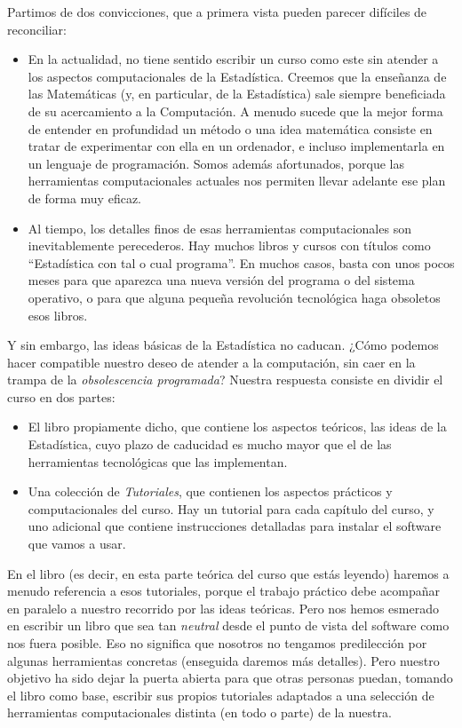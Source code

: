 \noindent Partimos de dos convicciones, que a primera vista pueden parecer difíciles de reconciliar:
\begin{itemize}
  \item En la actualidad, no tiene sentido escribir un curso como este sin atender a los aspectos computacionales de la Estadística. Creemos que la enseñanza de las Matemáticas (y, en particular, de la Estadística) sale siempre beneficiada de su acercamiento a la Computación. A menudo sucede que la mejor forma de entender en profundidad un método o una idea matemática consiste en tratar de experimentar con ella en un ordenador, e incluso implementarla en un lenguaje de programación. Somos además afortunados, porque las herramientas computacionales actuales nos permiten llevar adelante ese plan de forma muy eficaz.
  \item Al tiempo, los detalles finos de esas herramientas computacionales son inevitablemente perecederos. Hay muchos libros y cursos con títulos como ``Estadística con tal o cual programa''. En muchos casos, basta con unos pocos meses para que aparezca una nueva versión del programa o del sistema operativo, o para que alguna pequeña revolución tecnológica haga obsoletos esos libros.
\end{itemize}
Y sin embargo, las ideas básicas de la Estadística no caducan. ¿Cómo podemos hacer compatible nuestro deseo de atender a la computación, sin caer en la trampa de la {\em obsolescencia programada}? Nuestra respuesta consiste en dividir el curso en dos partes:
\begin{itemize}
  \item El libro propiamente dicho, que contiene los aspectos teóricos, las ideas de la Estadística, cuyo plazo de caducidad es mucho mayor que el de las herramientas tecnológicas que las implementan.
  \item Una colección de {\em Tutoriales}, que contienen los aspectos prácticos y computacionales del curso. Hay un tutorial para cada capítulo del curso, y uno adicional que contiene instrucciones detalladas para instalar el software que vamos a usar.
\end{itemize}
En el libro (es decir, en esta parte teórica del curso que estás leyendo) haremos a menudo referencia a esos tutoriales, porque el trabajo práctico debe acompañar en paralelo a nuestro recorrido por las ideas teóricas. Pero nos hemos esmerado en escribir un libro que sea tan {\em neutral} desde el punto de vista del software como nos fuera posible. Eso no significa que nosotros no tengamos predilección por algunas herramientas concretas (enseguida daremos más detalles). Pero nuestro objetivo ha sido dejar la puerta abierta para que otras personas puedan, tomando el libro como base, escribir sus propios tutoriales adaptados a una selección de herramientas computacionales distinta (en todo o parte) de la nuestra.

